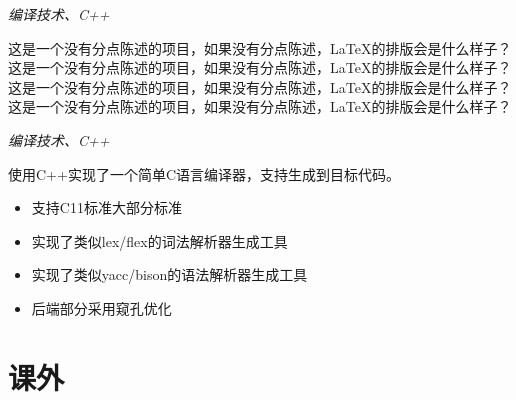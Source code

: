 \documentclass{uniquecv}
\begin{document}
\textit{编译技术、C++}
\vspace{0.4ex}

这是一个没有分点陈述的项目，如果没有分点陈述，LaTeX的排版会是什么样子？
这是一个没有分点陈述的项目，如果没有分点陈述，LaTeX的排版会是什么样子？
这是一个没有分点陈述的项目，如果没有分点陈述，LaTeX的排版会是什么样子？
这是一个没有分点陈述的项目，如果没有分点陈述，LaTeX的排版会是什么样子？

\textit{编译技术、C++}
\vspace{0.4ex}

使用C++实现了一个简单C语言编译器，支持生成到目标代码。
\begin{itemize}
  \item 支持C11标准大部分标准
  \item 实现了类似lex/flex的词法解析器生成工具
  \item 实现了类似yacc/bison的语法解析器生成工具
  \item 后端部分采用窥孔优化
\end{itemize}



\section{课外}
\end{document}
